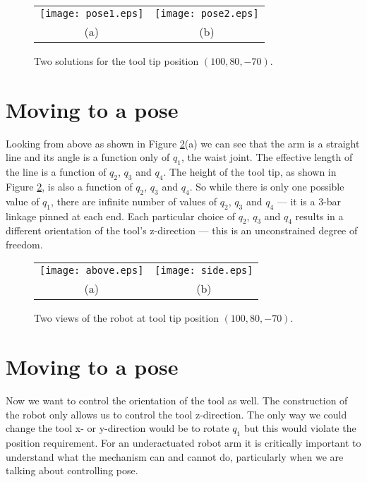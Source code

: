 \documentclass[11pt]{article}
\begin{document}
	\begin{figure}
	\centering
	\begin{tabular}{cc}
	\texttt{[image: pose1.eps]} & \texttt{[image: pose2.eps]} \\
	(a) & (b) 
	\end{tabular}
	\caption{Two solutions for the tool tip position $(100, 80, -70)$.}
	\label{fig:poses}
	\end{figure}
	\section{Moving to a pose}

Looking from above as shown in Figure \ref{fig:ortho}(a) we can see that the arm is a straight line and its angle is a function only
of $q_1$, the waist joint.  The effective length of the line is a function of $q_2$, $q_3$ and $q_4$.  The height of the tool tip, 
as shown in Figure \ref{fig:ortho}, is also a function  of $q_2$, $q_3$ and $q_4$.
So while there is only one possible value of $q_1$, there are infinite number of values of $q_2$, $q_3$ and $q_4$ --- it is a 3-bar linkage
pinned at each end.
Each particular choice of $q_2$, $q_3$ and $q_4$ results in a different orientation of the tool's z-direction --- this is an unconstrained degree
of freedom.

	\begin{figure}
	\centering
	\begin{tabular}{cc}
	\texttt{[image: above.eps]} & \texttt{[image: side.eps]} \\
	(a) & (b) 
	\end{tabular}
	\caption{Two views of the robot at tool tip position $(100, 80, -70)$.}
	\label{fig:ortho}
	\end{figure}
	
	
\section{Moving to a pose}
Now we want to control the orientation of the tool as well.
The construction of the robot only allows us to control the tool z-direction.  The only way we could change the tool x- or y-direction would
be to rotate $q_1$ but this would violate the position requirement.  
For an underactuated robot arm it is critically important to understand what the mechanism can and cannot do, particularly when we are talking
about controlling pose.
\end{document}
